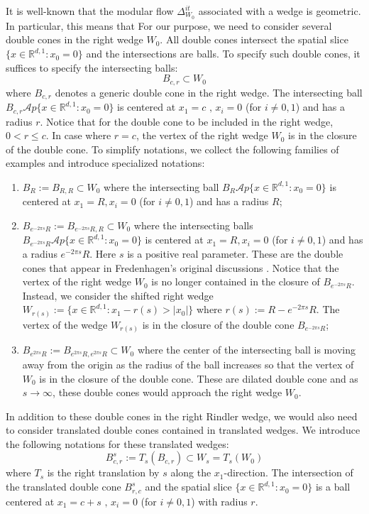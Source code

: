 \documentclass[a4paper,11pt]{article}
\theoremstyle{definition}
\begin{document}
It is well-known \cite{bisognanowichmann}that the modular flow $\Delta_{W_0}^{it}$ associated with a wedge is geometric. In particular, this means that For our purpose, we need to consider several double cones in the right wedge $W_0$. All double cones intersect the spatial slice $\{x\in\mathbb{R}^{d,1}: x_0 = 0\}$ and the intersections are balls. To specify such double cones, it suffices to specify the intersecting balls: 
\begin{equation}
    B_{c,r}\subset W_0
\end{equation}
where $B_{c,r}$ denotes a generic double cone in the right wedge. The intersecting ball $B_{c,r}\mathcal{A}p\{x\in\mathbb{R}^{d,1}:x_0 = 0\}$ is centered at $x_1 = c\text{ , }x_i = 0$ (for $i\neq 0,1$) and has a radius $r$. Notice that for the double cone to be included in the right wedge, $0 < r \leq c$. In case where $r = c$, the vertex of the right wedge $W_0$ is in the closure of the double cone. To simplify notations, we collect the following families of examples and introduce specialized notations:
\begin{enumerate}
    \item $B_R:=B_{R, R}\subset W_0$ where the intersecting ball $B_R\mathcal{A}p \{x\in\mathbb{R}^{d,1}: x_0 = 0\}$ is centered at $x_1 = R, x_i = 0$ (for $i\neq 0, 1$) and has a radius $R$;
    \item $B_{e^{-2\pi s}R} := B_{e^{-2\pi s}R, R}\subset W_0$ where the intersecting balls $B_{e^{-2\pi s}R}\mathcal{A}p\{x\in\mathbb{R}^{d,1}:x_0 =0\}$ is centered at $x_1 = R, x_i = 0$ (for $i\neq 0, 1$) and has a radius $e^{-2\pi s}R$. Here $s$ is a positive real parameter. These are the double cones that appear in Fredenhagen's original discussions \cite{fredenhagen}. Notice that the vertex of the right wedge $W_0$ is no longer contained in the closure of $B_{e^{-2\pi s}R}$. Instead, we consider the shifted right wedge $W_{r(s)}:= \{x\in\mathbb{R}^{d,1}: x_1 - r(s) > |x_0|\}$ where $r(s) := R - e^{-2\pi s}R$. The vertex of the wedge $W_{r(s)}$ is in the closure of the double cone $B_{e^{-2\pi s}R}$;
    \item $B_{e^{2\pi s}R}:= B_{e^{2\pi s}R, e^{2\pi s}R}\subset W_0$ where the center of the intersecting ball is moving away from the origin as the radius of the ball increases so that the vertex of $W_0$ is in the closure of the double cone. These are dilated double cone and as $s\rightarrow \infty$, these double cones would approach the right wedge $W_0$.
\end{enumerate}
In addition to these double cones in the right Rindler wedge, we would also need to consider translated double cones contained in translated wedges. We introduce the following notations for these translated wedges:
\begin{equation}
    B^s_{c,r} := T_s(B_{c,r})\subset W_s  = T_s(W_0)
\end{equation}
where $T_s$ is the right translation by $s$ along the $x_1$-direction. The intersection of the translated double cone $B^s_{r,c}$ and the spatial slice $\{x\in\mathbb{R}^{d,1}:x_0 = 0\}$ is a ball centered at $x_1 = c+ s\text{ , }x_i = 0$ (for $i\neq 0, 1$) with radius $r$.
\end{document}
